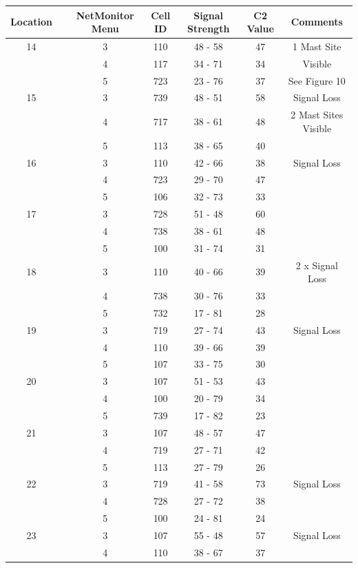 \documentclass[a4paper,12pt]{article}
\begin{document}
\begin{tabular}{|c|c|c|c|c|c|c|}
\hline
Location	&	&	NetMonitor Menu	&	Cell ID	&	Signal Strength	& C2 Value	& Comments	\\
\hline
14	&		&	 3	&	110	&	48 - 58	&	47	& 1 Mast Site \\
 	&		&	 4	&	117	&	34 - 71	&	34	& Visible	\\
 	&		&	 5	&	723	&	23 - 76	&	37	& See Figure 10	\\
\hline	
15	&		&	 3	&	739	&	48 - 51	&	58	& Signal Loss \\
 	&		&	 4	&	717	&	38 - 61	&	48	& 2 Mast Sites Visible \\
 	&		&	 5	&	113	&	38 - 65	&	40	& 	\\
\hline	
16	&		&	 3	&	110	&	42 - 66	&	38	&Signal Loss \\
 	&		&	 4	&	723	&	29 - 70	&	47	&		\\
 	&		&	 5	&	106	&	32 - 73	&	33	&		\\
\hline	
17	&		&	 3	&	728	&	51 - 48	&	60	&		\\
 	&		&	 4	&	738	&	38 - 61	&	48	&		\\
 	&		&	 5	&	100	&	31 - 74	&	31	&		\\
\hline	
18	&		&	 3	&	110	&	40 - 66	&	39	& 2 x Signal Loss \\
 	&		&	 4	&	738	&	30 - 76	&	33	&		\\
 	&		&	 5	&	732	&	17 - 81	&	28	&		\\
\hline	
19	&		&	 3	&	719	&	27 - 74	&	43	& Signal Loss \\
 	&		&	 4	&	110	&	39 - 66	&	39	&		\\
 	&		&	 5	&	107	&	33 - 75	&	30	&		\\
\hline	
20	&		&	 3	&	107	&	51 - 53	&	43	& 		\\
 	&		&	 4	&	100	&	20 - 79	&	34	&		\\
 	&		&	 5	&	739	&	17 - 82	&	23	&		\\
\hline	
21	&		&	 3	&	107	&	48 - 57	&	47	&		\\
 	&		&	 4	&	719	&	27 - 71	&	42	&		\\
 	&		&	 5	&	113	&	27 - 79	&	26	&		\\
\hline	
22	&		&	 3	&	719	&	41 - 58	&	73	&Signal Loss \\
 	&		&	 4	&	728	&	27 - 72	&	38	&		\\
 	&		&	 5	&	100	&	24 - 81	&	24	&		\\
\hline	
23	&		&	 3	&	107	&	55 - 48	&	57	&Signal Loss \\
 	&		&	 4	&	110	&	38 - 67	&	37	&		\\

\end{tabular}
\end{document}
